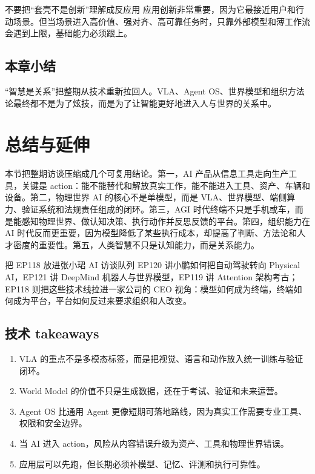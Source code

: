 \documentclass[a4paper]{article}
\begin{document}
\begin{warningbox}{不要把“套壳不是创新”理解成反应用}
应用创新非常重要，因为它最接近用户和行动场景。但当场景进入高价值、强对齐、高可靠任务时，只靠外部模型和薄工作流会遇到上限，基础能力必须跟上。
\end{warningbox}

\subsection{本章小结}

“智慧是关系”把整期从技术重新拉回人。VLA、Agent OS、世界模型和组织方法论最终都不是为了炫技，而是为了让智能更好地进入人与世界的关系中。

\section{总结与延伸}

本节把整期访谈压缩成几个可复用结论。第一，AI 产品从信息工具走向生产工具，关键是 action：能不能替代和解放真实工作，能不能进入工具、资产、车辆和设备。第二，物理世界 AI 的核心不是单模型，而是 VLA、世界模型、端侧算力、验证系统和法规责任组成的闭环。第三，AGI 时代终端不只是手机或车，而是能感知物理世界、做认知决策、执行动作并反思反馈的平台。第四，组织能力在 AI 时代反而更重要，因为模型降低了某些执行成本，却提高了判断、方法论和人才密度的重要性。第五，人类智慧不只是认知能力，而是关系能力。

\begin{importantbox}{把 EP118 放进张小珺 AI 访谈队列}
EP120 讲小鹏如何把自动驾驶转向 Physical AI，EP121 讲 DeepMind 机器人与世界模型，EP119 讲 Attention 架构考古；EP118 则把这些技术线拉进一家公司的 CEO 视角：模型如何成为终端，终端如何成为平台，平台如何反过来要求组织和人改变。
\end{importantbox}

\subsection{技术 takeaways}

\begin{enumerate}
\item VLA 的重点不是多模态标签，而是把视觉、语言和动作放入统一训练与验证闭环。
\item World Model 的价值不只是生成数据，还在于考试、验证和未来运营。
\item Agent OS 比通用 Agent 更像短期可落地路线，因为真实工作需要专业工具、权限和安全边界。
\item 当 AI 进入 action，风险从内容错误升级为资产、工具和物理世界错误。
\item 应用层可以先跑，但长期必须补模型、记忆、评测和执行可靠性。
\end{enumerate}
\end{document}
